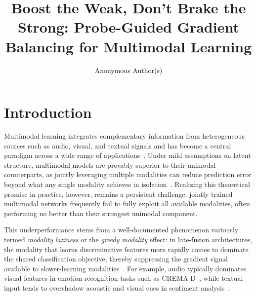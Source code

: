 \documentclass{article}
\title{Boost the Weak, Don't Brake the Strong: Probe-Guided Gradient Balancing for Multimodal Learning}
\author{%
  Anonymous Author(s)
}
\begin{document}
\maketitle


\begin{abstract}
\end{abstract}


\section{Introduction}
\label{sec:intro}


Multimodal learning integrates complementary information from heterogeneous sources such as audio, visual, and textual signals and has become a central paradigm across a wide range of applications~\citep{baltrusaitis2019multimodal}. Under mild assumptions on latent structure, multimodal models are provably superior to their unimodal counterparts, as jointly leveraging multiple modalities can reduce prediction error beyond what any single modality achieves in isolation~\citep{huang2021multimodal}. Realizing this theoretical promise in practice, however, remains a persistent challenge: jointly trained multimodal networks frequently fail to fully exploit all available modalities, often performing no better than their strongest unimodal component.


This underperformance stems from a well-documented phenomenon variously termed \emph{modality laziness} or the \emph{greedy modality} effect: in late-fusion architectures, the modality that learns discriminative features more rapidly comes to dominate the shared classification objective, thereby suppressing the gradient signal available to slower-learning modalities~\citep{wang2020gblending,peng2022ogmge}. For example, audio typically dominates visual features in emotion recognition tasks such as CREMA-D~\citep{cao2014cremad}, while textual input tends to overshadow acoustic and visual cues in sentiment analysis~\citep{peng2022ogmge}.
\end{document}
